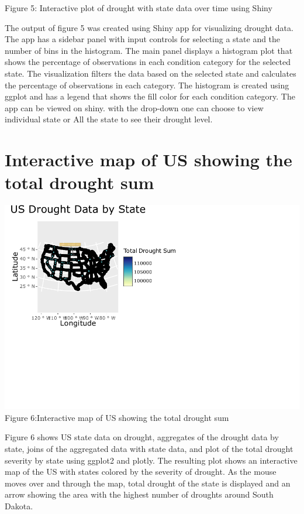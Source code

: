 \documentclass[
]{article}
\begin{document}
Figure 5: Interactive plot of drought with state data over time using
Shiny

The output of figure 5 was created using Shiny app for visualizing
drought data. The app has a sidebar panel with input controls for
selecting a state and the number of bins in the histogram. The main
panel displays a histogram plot that shows the percentage of
observations in each condition category for the selected state. The
visualization filters the data based on the selected state and
calculates the percentage of observations in each category. The
histogram is created using ggplot and has a legend that shows the fill
color for each condition category. The app can be viewed on shiny. with
the drop-down one can choose to view individual state or All the state
to see their drought level.

\hypertarget{interactive-map-of-us-showing-the-total-drought-sum}{%
\section{Interactive map of US showing the total drought
sum}\label{interactive-map-of-us-showing-the-total-drought-sum}}

\includegraphics{C7083-213221-Markdown_files/figure-latex/Interactive map of US-1.pdf}
Figure 6:Interactive map of US showing the total drought sum

Figure 6 shows US state data on drought, aggregates of the drought data
by state, joins of the aggregated data with state data, and plot of the
total drought severity by state using ggplot2 and plotly. The resulting
plot shows an interactive map of the US with states colored by the
severity of drought. As the mouse moves over and through the map, total
drought of the state is displayed and an arrow showing the area with the
highest number of droughts around South Dakota.
\end{document}
